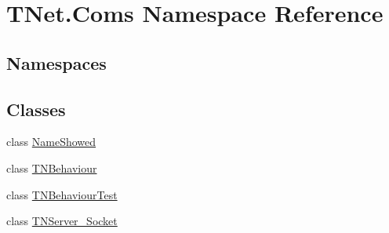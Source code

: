 \hypertarget{namespace_t_net_1_1_coms}{}\section{T\+Net.\+Coms Namespace Reference}
\label{namespace_t_net_1_1_coms}
\subsection*{Namespaces}
\begin{DoxyCompactItemize}
\end{DoxyCompactItemize}
\subsection*{Classes}
\begin{DoxyCompactItemize}
\item 
class \mbox{\hyperlink{class_t_net_1_1_coms_1_1_name_showed}{Name\+Showed}}
\item 
class \mbox{\hyperlink{class_t_net_1_1_coms_1_1_t_n_behaviour}{T\+N\+Behaviour}}
\item 
class \mbox{\hyperlink{class_t_net_1_1_coms_1_1_t_n_behaviour_test}{T\+N\+Behaviour\+Test}}
\item 
class \mbox{\hyperlink{class_t_net_1_1_coms_1_1_t_n_server___socket}{T\+N\+Server\+\_\+\+Socket}}
\end{DoxyCompactItemize}
